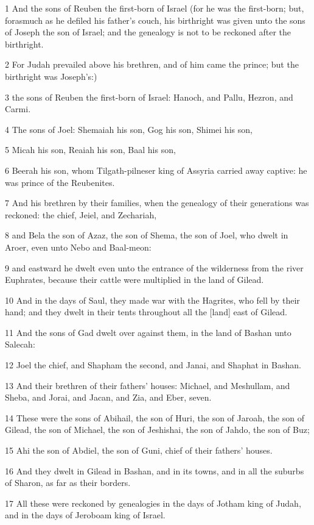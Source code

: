 \par 1 And the sons of Reuben the first-born of Israel (for he was the first-born; but, forasmuch as he defiled his father's couch, his birthright was given unto the sons of Joseph the son of Israel; and the genealogy is not to be reckoned after the birthright.
\par 2 For Judah prevailed above his brethren, and of him came the prince; but the birthright was Joseph's:)
\par 3 the sons of Reuben the first-born of Israel: Hanoch, and Pallu, Hezron, and Carmi.
\par 4 The sons of Joel: Shemaiah his son, Gog his son, Shimei his son,
\par 5 Micah his son, Reaiah his son, Baal his son,
\par 6 Beerah his son, whom Tilgath-pilneser king of Assyria carried away captive: he was prince of the Reubenites.
\par 7 And his brethren by their families, when the genealogy of their generations was reckoned: the chief, Jeiel, and Zechariah,
\par 8 and Bela the son of Azaz, the son of Shema, the son of Joel, who dwelt in Aroer, even unto Nebo and Baal-meon:
\par 9 and eastward he dwelt even unto the entrance of the wilderness from the river Euphrates, because their cattle were multiplied in the land of Gilead.
\par 10 And in the days of Saul, they made war with the Hagrites, who fell by their hand; and they dwelt in their tents throughout all the [land] east of Gilead.
\par 11 And the sons of Gad dwelt over against them, in the land of Bashan unto Salecah:
\par 12 Joel the chief, and Shapham the second, and Janai, and Shaphat in Bashan.
\par 13 And their brethren of their fathers' houses: Michael, and Meshullam, and Sheba, and Jorai, and Jacan, and Zia, and Eber, seven.
\par 14 These were the sons of Abihail, the son of Huri, the son of Jaroah, the son of Gilead, the son of Michael, the son of Jeshishai, the son of Jahdo, the son of Buz;
\par 15 Ahi the son of Abdiel, the son of Guni, chief of their fathers' houses.
\par 16 And they dwelt in Gilead in Bashan, and in its towns, and in all the suburbs of Sharon, as far as their borders.
\par 17 All these were reckoned by genealogies in the days of Jotham king of Judah, and in the days of Jeroboam king of Israel.

